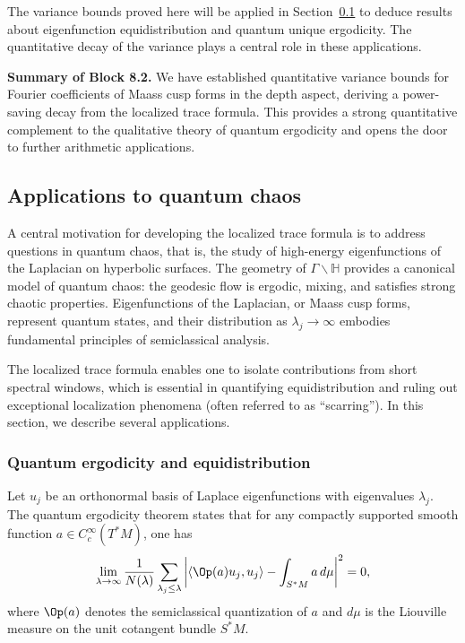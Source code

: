 The variance bounds proved here will be applied in Section~\ref{sec:quantumchaos} to deduce results about eigenfunction equidistribution and quantum unique ergodicity. The quantitative decay of the variance plays a central role in these applications.

\medskip

\noindent\textbf{Summary of Block 8.2.}  
We have established quantitative variance bounds for Fourier coefficients of Maass cusp forms in the depth aspect, deriving a power-saving decay from the localized trace formula. This provides a strong quantitative complement to the qualitative theory of quantum ergodicity and opens the door to further arithmetic applications.

\subsection{Applications to quantum chaos}\label{sec:quantumchaos}

A central motivation for developing the localized trace formula is to address questions in quantum chaos, that is, the study of high-energy eigenfunctions of the Laplacian on hyperbolic surfaces. The geometry of $\Gamma \backslash \mathbb{H}$ provides a canonical model of quantum chaos: the geodesic flow is ergodic, mixing, and satisfies strong chaotic properties. Eigenfunctions of the Laplacian, or Maass cusp forms, represent quantum states, and their distribution as $\lambda_j \to \infty$ embodies fundamental principles of semiclassical analysis.

The localized trace formula enables one to isolate contributions from short spectral windows, which is essential in quantifying equidistribution and ruling out exceptional localization phenomena (often referred to as “scarring”). In this section, we describe several applications.

\subsubsection{Quantum ergodicity and equidistribution}

Let $u_j$ be an orthonormal basis of Laplace eigenfunctions with eigenvalues $\lambda_j$. The quantum ergodicity theorem states that for any compactly supported smooth function $a \in C_c^\infty(T^*M)$, one has
\[
\lim_{\lambda \to \infty} \frac{1}{N(\lambda)} \sum_{\lambda_j \leq \lambda} \left| \langle \Op(a) u_j, u_j \rangle - \int_{S^*M} a \, d\mu \right|^2 = 0,
\]
where $\Op(a)$ denotes the semiclassical quantization of $a$ and $d\mu$ is the Liouville measure on the unit cotangent bundle $S^*M$.

